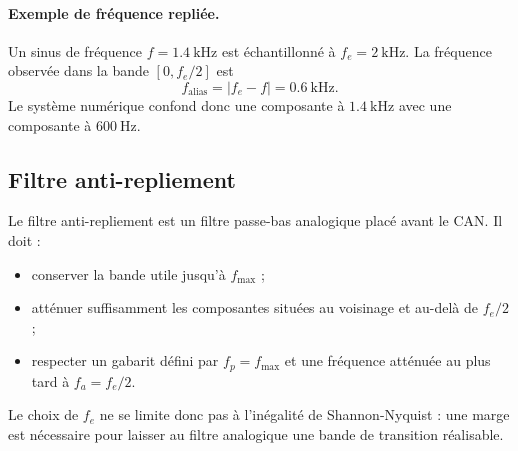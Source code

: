 \begin{center}
\end{center}

\paragraph{Exemple de fréquence repliée.}
Un sinus de fréquence $f=\SI{1.4}{\kilo\hertz}$ est échantillonné à $f_e=\SI{2}{\kilo\hertz}$. La fréquence observée dans la bande $[0,f_e/2]$ est
\[
f_{\mathrm{alias}}=|f_e-f|=\SI{0.6}{\kilo\hertz}.
\]
Le système numérique confond donc une composante à $\SI{1.4}{\kilo\hertz}$ avec une composante à $\SI{600}{\hertz}$.

\subsection{Filtre anti-repliement}\label{sec:elec-filtre-anti-repliement}

Le filtre anti-repliement est un filtre passe-bas analogique placé avant le CAN. Il doit :
\begin{itemize}
  \item conserver la bande utile jusqu'à $f_{\max}$ ;
  \item atténuer suffisamment les composantes situées au voisinage et au-delà de $f_e/2$ ;
  \item respecter un gabarit défini par $f_p=f_{\max}$ et une fréquence atténuée au plus tard à $f_a=f_e/2$.
\end{itemize}

\begin{center}
\end{center}

Le choix de $f_e$ ne se limite donc pas à l'inégalité de Shannon-Nyquist : une marge est nécessaire pour laisser au filtre analogique une bande de transition réalisable.

